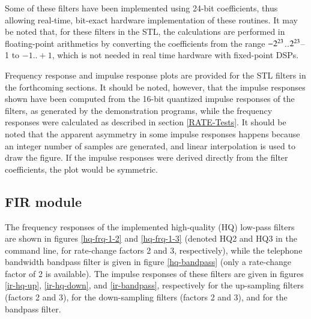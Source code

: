 Some of these filters have been implemented using 24-bit coefficients,
thus allowing real-time, bit-exact hardware implementation of these
routines. It may be noted that, for these filters in the STL, the
calculations are performed in floating-point arithmetics by converting
the coefficients from the range $\rm -2^{23}$..$\rm 2^{23}$--1 to $-1
.. +1$, which is not needed in real time hardware with fixed-point
DSPs.

Frequency response and impulse response plots are provided for the
STL filters in the forthcoming sections. It should be noted,
however, that the impulse responses shown have been computed from
the 16-bit quantized impulse responses of the filters, as generated
by the demonstration programs, while the frequency responses were
calculated as described in section \ref{RATE-Tests}. It should be
noted that the apparent asymmetry in some impulse responses happens
because an integer number of samples are generated, and linear
interpolation is used to draw the figure. If the impulse responses
were derived directly from the filter coefficients, the plot would
be symmetric.




\subsection{FIR module}

The frequency responses of the implemented high-quality (HQ) low-pass
filters are shown in figures \ref{hq-frq-1-2} and \ref{hq-frq-1-3}
(denoted HQ2 and HQ3 in the command line, for rate-change factors 2 and 3, respectively), while the telephone
bandwidth bandpass filter is given in figure \ref{hq-bandpass} (only
a rate-change factor of 2 is available). The impulse responses of
these filters are given in figures \ref{ir-hq-up}, \ref{ir-hq-down},
and \ref{ir-bandpass}, respectively for the up-sampling filters
(factors 2 and 3), for the down-sampling filters (factors 2 and 3),
and for the bandpass filter. 

